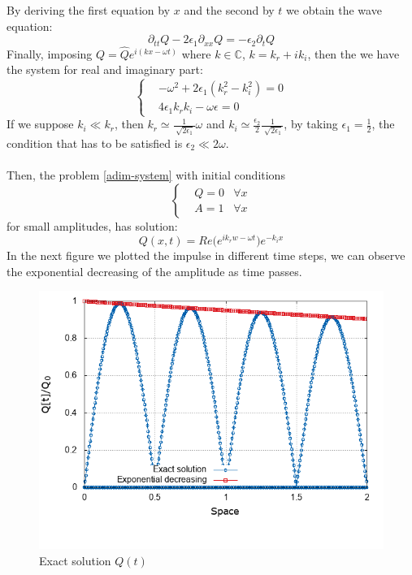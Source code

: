 \documentclass[12pt,a4paper]{article}
\numberwithin{equation}{section}
\begin{document}
By deriving the first equation by $x$ and the second by $t$ we obtain the wave equation:
\begin{equation*}
\partial_{tt}Q-2\epsilon_1\partial_{xx}Q=-\epsilon_2\partial_tQ
\end{equation*}
Finally, imposing $Q= \hat{Q}e^{i(kx-\omega t)}$ where $k \in \mathbb{C}$, $k = k_r + ik_i$, then the we have the system for real and imaginary part:
\begin{equation*}
	\left\{
      \begin{aligned}
       & -\omega^2+2\epsilon_1(k_r^2-k_i^2) = 0\\
       & 4\epsilon_1k_rk_i - \omega\epsilon = 0
      \end{aligned}
    \right.
\end{equation*}
If we suppose $k_i \ll k_r$, then $k_r \simeq \frac{1}{\sqrt[]{2\epsilon_1}}\omega$ and $k_i \simeq \frac{\epsilon_2}{2}\frac{1}{\sqrt[]{2\epsilon_1}}$, by taking $\epsilon_1 = \frac{1}{2}$, the condition that has to be satisfied is $\epsilon_2 \ll 2\omega$.\\
\\
Then, the problem \ref{adim-system} with initial conditions
\begin{equation*}
	\left\{
      \begin{aligned}
       & Q = 0 & \forall x\\
       & A = 1 & \forall x
      \end{aligned}
    \right.
\end{equation*}
for small amplitudes, has solution:
\begin{equation}
Q(x,t) = Re\big(e^{ik_rw-\omega t}\big)e^{-k_ix}
\end{equation} 
In the next figure we plotted the impulse in different time steps, we can observe the exponential decreasing of the amplitude as time passes.
\begin{figure}[H]
  \centering
    \includegraphics[width=12cm]{Exact_exponential.png}
    \caption{Exact solution $Q(t)$}
\end{figure}
\end{document}
